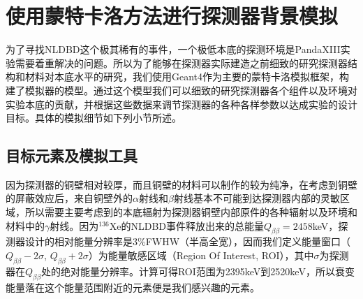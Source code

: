 \chapter{使用蒙特卡洛方法进行探测器背景模拟}
\label{chapter:background}

为了寻找NLDBD这个极其稀有的事件，一个极低本底的探测环境是PandaXIII实验需要着重解决的问题。所以为了能够在探测器实际建造之前细致的研究探测器结构和材料对本底水平的研究，我们使用Geant4\supercite{Agostinelli:2002hh}作为主要的蒙特卡洛模拟框架，构建了模拟器的模型。通过这个模型我们可以细致的研究探测器各个组件以及环境对实验本底的贡献，并根据这些数据来调节探测器的各种各样参数以达成实验的设计目标。具体的模拟细节如下列小节所述。

\section{目标元素及模拟工具}

因为探测器的铜壁相对较厚，而且铜壁的材料可以制作的较为纯净，在考虑到铜壁的屏蔽效应后，来自铜壁外的$\alpha$射线和$\beta$射线基本不可能到达探测器内部的灵敏区域，所以需要主要考虑到的本底辐射为探测器铜壁内部原件的各种辐射以及环境和材料中的$\gamma$射线。因为$^{136}$Xe的NLDBD事件释放出来的总能量$Q_{\beta\beta}=2458$keV，探测器设计的相对能量分辨率是3\%FWHW（半高全宽），因而我们定义能量窗口（$Q_{\beta\beta}-2\sigma$, $Q_{\beta\beta}+2\sigma$）为能量敏感区域（Region Of Interest, ROI），其中$\sigma$为探测器在$Q_{\beta\beta}$处的绝对能量分辨率。计算可得ROI范围为2395keV到2520keV，所以衰变能量落在这个能量范围附近的元素便是我们感兴趣的元素。


